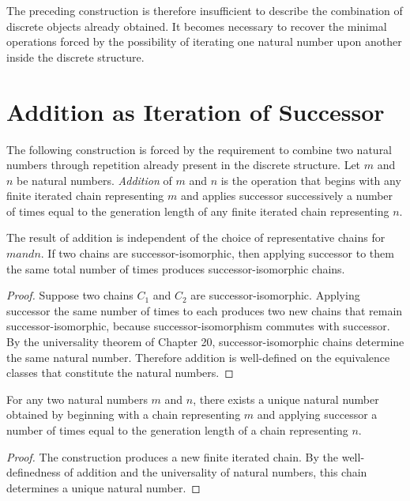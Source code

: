 \documentclass[12pt,anyside]{book}
\newcommand{\term}[1]{\textit{#1}}             %
\begin{document}
The preceding construction is therefore insufficient to describe the combination of discrete objects already obtained. It becomes necessary to recover the minimal operations forced by the possibility of iterating one natural number upon another inside the discrete structure.

\section{Addition as Iteration of Successor}
The following construction is forced by the requirement to combine two natural numbers through repetition already present in the discrete structure. Let $m$ and $n$ be natural numbers. \term{Addition} of $m$ and $n$ is the operation that begins with any finite iterated chain representing $m$ and applies successor successively a number of times equal to the generation length of any finite iterated chain representing $n$.

\begin{theorem}
The result of addition is independent of the choice of representative chains for $m and n$. If two chains are successor-isomorphic, then applying successor to them the same total number of times produces successor-isomorphic chains.
\end{theorem}

\begin{proof}
Suppose two chains $C_1$ and $C_2$ are successor-isomorphic. Applying successor the same number of times to each produces two new chains that remain successor-isomorphic, because successor-isomorphism commutes with successor. By the universality theorem of Chapter 20, successor-isomorphic chains determine the same natural number. Therefore addition is well-defined on the equivalence classes that constitute the natural numbers.
\end{proof}

\begin{theorem}
For any two natural numbers $m$ and $n$, there exists a unique natural number obtained by beginning with a chain representing $m$ and applying successor a number of times equal to the generation length of a chain representing $n$.
\end{theorem}

\begin{proof}
The construction produces a new finite iterated chain. By the well-definedness of addition and the universality of natural numbers, this chain determines a unique natural number.
\end{proof}
\end{document}
